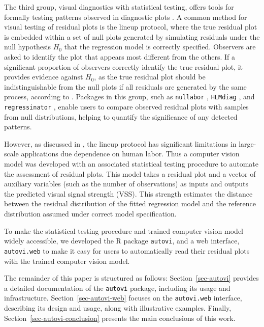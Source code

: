 \documentclass[
doublespace,
  times]{anzsauth}
\begin{document}
The third group, visual diagnostics with statistical testing, offers
tools for formally testing patterns observed in diagnostic plots
\citep{buja2009statistical}. A common method for visual testing of
residual plots is the lineup protocol, where the true residual plot is
embedded within a set of null plots generated by simulating residuals
under the null hypothesis \(H_0\) that the regression model is correctly
specified. Observers are asked to identify the plot that appears most
different from the others. If a significant proportion of observers
correctly identify the true residual plot, it provides evidence against
\(H_0\), as the true residual plot should be indistinguishable from the
null plots if all residuals are generated by the same process, according
to \citet{buja2009statistical}. Packages in this group, such as
\texttt{nullabor} \citep{nullabor}, \texttt{HLMdiag}
\citep{loy2014hlmdiag}, and \texttt{regressinator}
\citep{regressinator}, enable users to compare observed residual plots
with samples from null distributions, helping to quantify the
significance of any detected patterns.

However, as discussed in \citet{li2024automated}, the lineup protocol
has significant limitations in large-scale applications due dependence
on human labor. Thus a computer vision model was developed with an
associated statistical testing procedure to automate the assessment of
residual plots. This model takes a residual plot and a vector of
auxiliary variables (such as the number of observations) as inputs and
outputs the predicted visual signal strength (VSS). This strength
estimates the distance between the residual distribution of the fitted
regression model and the reference distribution assumed under correct
model specification.

To make the statistical testing procedure and trained computer vision
model widely accessible, we developed the R package \texttt{autovi}, and
a web interface, \texttt{autovi.web} to make it easy for users to
automatically read their residual plots with the trained computer vision
model.

The remainder of this paper is structured as follows:
Section~\ref{sec-autovi} provides a detailed documentation of the
\texttt{autovi} package, including its usage and infrastructure.
Section~\ref{sec-autovi-web} focuses on the \texttt{autovi.web}
interface, describing its design and usage, along with illustrative
examples. Finally, Section~\ref{sec-autovi-conclusion} presents the main
conclusions of this work.
\end{document}
